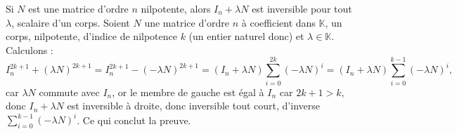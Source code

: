 \documentclass{article}
\renewenvironment{question_kholle}[2][ ]
{
	\subsection{\texorpdfstring{#2}{}}
	\notblank{#1}
	{
		\noindent #1
		\bigbreak
	}
	{}
	\begin{proof}
}
{
	\end{proof}
}
\begin{document}
\begin{question_kholle}
	{Si $N$ est une matrice d'ordre $n$ nilpotente, alors $I_n + \lambda N$ est inversible pour tout $\lambda$, scalaire d'un corps.}
	Soient $N$ une matrice d'ordre $n$ à coefficient dans $\mathbb{K}$, un corps, nilpotente, d'indice de nilpotence $k$ (un entier naturel donc) et $\lambda \in \mathbb{K}$. Calculons :
	\[
		I_n^{2k+1} + (\lambda N)^{2k+1} = I_n^{2k+1} - (- \lambda N)^{2k+1} = (I_n + \lambda N)\sum_{i=0}^{2k}(-\lambda N)^i =  (I_n + \lambda N)\sum_{i=0}^{k-1}(-\lambda N)^i,
	\]
	car $\lambda N$ commute avec $I_n$, or le membre de gauche est égal à $I_n$ car $2k+1 > k$, donc $I_n + \lambda N$ est inversible à droite, donc inversible tout court, d'inverse $\sum_{i=0}^{k-1}(-\lambda N)^i$. Ce qui conclut la preuve.
\end{question_kholle}
\end{document}
